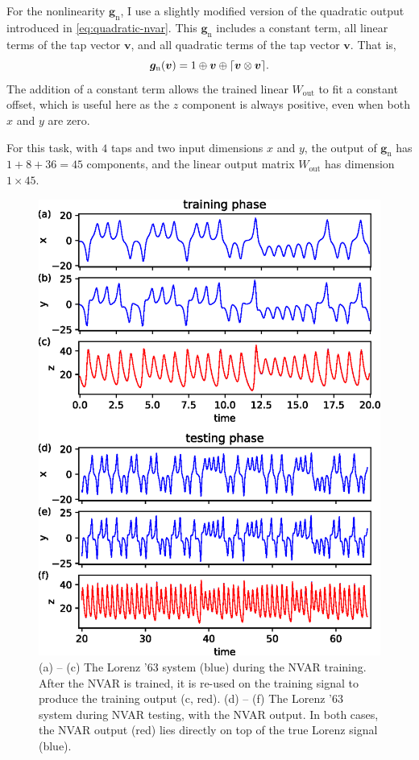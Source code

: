 For the nonlinearity $\bm{g}_\text{n}$, I use a slightly modified
version of the quadratic output introduced in
\cref{eq:quadratic-nvar}. This $\bm{g}_\text{n}$ includes a constant
term, all linear terms of the tap vector $\bm{v}$, and all quadratic
terms of the tap vector $\bm{v}$. That is,
\begin{equation}
  \label{eq:quadratic-nvar-const}
  \bm{g}_\text{n}(\bm{v}) = 1 \oplus \bm{v} \oplus \lceil\bm{v} \otimes \bm{v}\rceil.
\end{equation}
The addition of a constant term allows the trained linear
$W_\text{out}$ to fit a constant offset, which is useful here as the
$z$ component is always positive, even when both $x$ and $y$ are zero.

For this task, with $4$ taps and two input dimensions $x$ and $y$, the
output of $\bm{g}_\text{n}$ has $1 + 8 + 36 = 45$ components, and the linear
output matrix $W_\text{out}$ has dimension $1 \times 45$.

\begin{figure}
  \includegraphics{figures/nvar-infer-lorenz}
  \caption{(a) -- (c) The Lorenz '63 system (blue) during the NVAR
    training. After the NVAR is trained, it is re-used on the
    training signal to produce the training output (c, red). (d) --
    (f) The Lorenz '63 system during NVAR testing, with the NVAR
    output. In both cases, the NVAR output (red) lies directly on top
    of the true Lorenz signal (blue).}
  \label{fig:nvar-infer-lorenz}
\end{figure}

